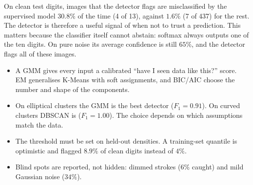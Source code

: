 \documentclass[11pt,a4paper]{article}
\begin{document}
On clean test digits, images that the detector flags are misclassified by the supervised model $30.8\%$ of the
time (4 of 13), against $1.6\%$ (7 of 437) for the rest. The detector is therefore a useful signal of when not to
trust a prediction. This matters because the classifier itself cannot abstain: softmax always outputs one of the
ten digits. On pure noise its average confidence is still $65\%$, and the detector flags all of these images.

\begin{summarybox}
\begin{itemize}[leftmargin=1.2em]
  \item A GMM gives every input a calibrated ``have I seen data like this?'' score. EM generalises K-Means with
        soft assignments, and BIC/AIC choose the number and shape of the components.
  \item On elliptical clusters the GMM is the best detector ($F_1=0.91$). On curved clusters DBSCAN is
        ($F_1=1.00$). The choice depends on which assumptions match the data.
  \item The threshold must be set on held-out densities. A training-set quantile is optimistic and flagged $8.9\%$
        of clean digits instead of $4\%$.
  \item Blind spots are reported, not hidden: dimmed strokes ($6\%$ caught) and mild Gaussian noise ($34\%$).
\end{itemize}
\end{summarybox}

\end{document}

